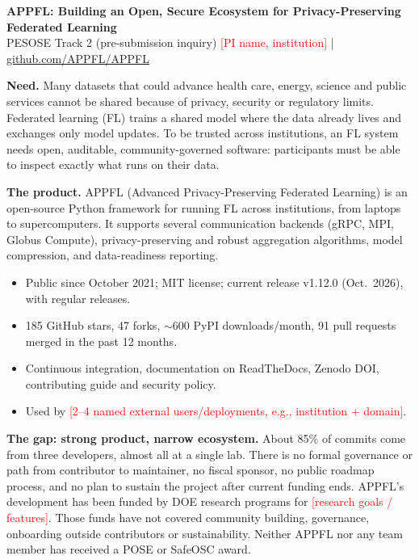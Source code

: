\documentclass[11pt]{article}
\newcommand{\todo}[1]{\textcolor{red}{[#1]}}
\newcommand{\sect}[1]{\vspace{3pt}\textbf{#1}\quad}
\begin{document}
{\large\textbf{APPFL: Building an Open, Secure Ecosystem for Privacy-Preserving Federated Learning}}\\
PESOSE Track 2 (pre-submission inquiry) \hfill \todo{PI name, institution} \;|\; \href{https://github.com/APPFL/APPFL}{github.com/APPFL/APPFL}

\sect{Need.}
Many datasets that could advance health care, energy, science and public services cannot be shared because of privacy, security or regulatory limits. Federated learning (FL) trains a shared model where the data already lives and exchanges only model updates. To be trusted across institutions, an FL system needs open, auditable, community-governed software: participants must be able to inspect exactly what runs on their data.

\sect{The product.}
APPFL (Advanced Privacy-Preserving Federated Learning) is an open-source Python framework for running FL across institutions, from laptops to supercomputers. It supports several communication backends (gRPC, MPI, Globus Compute), privacy-preserving and robust aggregation algorithms, model compression, and data-readiness reporting.
\begin{itemize}
  \item Public since October 2021; MIT license; current release v1.12.0 (Oct.\ 2026), with regular releases.
  \item 185 GitHub stars, 47 forks, $\sim$600 PyPI downloads/month, 91 pull requests merged in the past 12 months.
  \item Continuous integration, documentation on ReadTheDocs, Zenodo DOI, contributing guide and security policy.
  \item Used by \todo{2--4 named external users/deployments, e.g., institution + domain}.
\end{itemize}

\sect{The gap: strong product, narrow ecosystem.}
About 85\% of commits come from three developers, almost all at a single lab. There is no formal governance or path from contributor to maintainer, no fiscal sponsor, no public roadmap process, and no plan to sustain the project after current funding ends. APPFL's development has been funded by DOE research programs for \todo{research goals / features}. Those funds have not covered community building, governance, onboarding outside contributors or sustainability. Neither APPFL nor any team member has received a POSE or SafeOSC award.
\end{document}
